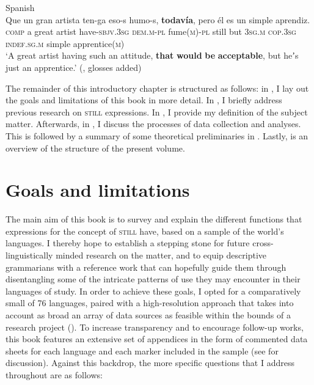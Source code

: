 \begin{exe}
	\ex\label{exSpanishAcceptableLimits}
	Spanish\\
	\gll Que un gran artista ten-ga eso-s humo-s, \textbf{todavía}, pero él es un simple aprendiz.\\
	\textsc{comp} a great artist have-\textsc{sbjv}.3\textsc{sg} \textsc{dem}.\textsc{m}-\textsc{pl} fume(\textsc{m})-\textsc{pl} still but \textsc{3sg.m} \textsc{cop}.3\textsc{sg} \textsc{indef}.\textsc{sg}.\textsc{m} simple apprentice(\textsc{m})\\
	\glt \lq A great artist having such an attitude, \textbf{that} \textbf{would} \textbf{be} \textbf{acceptable}, but heʼs just an apprentice.\rq{ }(\cite[207]{Bosque2016}, glosses added)
\end{exe}

The remainder of this introductory chapter is structured as follows: in , I lay out the goals and limitations of this book in more detail.  In , I briefly address previous research on \textsc{still} expressions. In , I provide my definition of the subject matter. Afterwards, in , I discuss the processes of data collection and analyses. This is followed by a summary of some theoretical preliminaries in . Lastly,  is an overview of the structure of the present volume.

\section{Goals and limitations}
\label{sectionGoalsLimitations}
The main aim of this book is to survey and explain the different functions that expressions for the concept of \textsc{still} have, based on a sample of the world's languages. I thereby hope to establish a stepping stone for future cross-linguistically minded research on the matter, and to equip descriptive grammarians with a reference work that can hopefully guide them through disentangling some of the intricate patterns of use they may encounter in their languages of study. In order to achieve these goals, I opted for a comparatively small  of 76 languages, paired with a high-resolution approach that takes into account as broad an array of data sources as feasible within the bounds of a research project (). To increase transparency and to encourage follow-up works, this book features an extensive set of appendices in the form of commented data sheets for each language and each marker included in the sample (see  for discussion). Against this backdrop, the more specific questions that I address throughout  are as follows:\medskip

